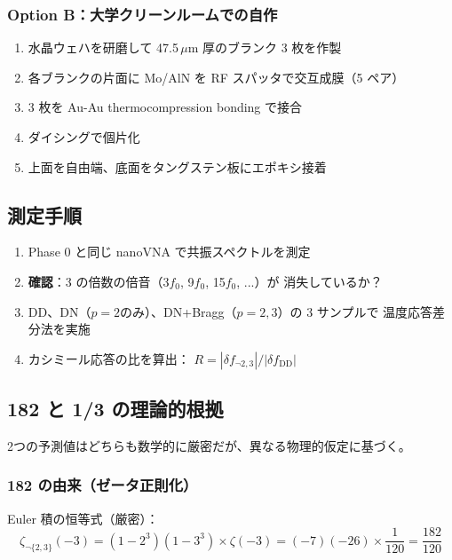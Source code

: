 \documentclass[11pt,a4paper]{article}
\begin{document}
\subsubsection{Option B：大学クリーンルームでの自作}

\begin{enumerate}
\item 水晶ウェハを研磨して 47.5\,$\mu$m 厚のブランク 3 枚を作製
\item 各ブランクの片面に Mo/AlN を RF スパッタで交互成膜（5 ペア）
\item 3 枚を Au-Au thermocompression bonding で接合
\item ダイシングで個片化
\item 上面を自由端、底面をタングステン板にエポキシ接着
\end{enumerate}

\subsection{測定手順}

\begin{enumerate}
\item Phase 0 と同じ nanoVNA で共振スペクトルを測定
\item \textbf{確認}：3 の倍数の倍音（3$f_0$, 9$f_0$, 15$f_0$, ...）が
  消失しているか？
\item DD、DN（$p=2$のみ）、DN+Bragg（$p=2,3$）の 3 サンプルで
  温度応答差分法を実施
\item カシミール応答の比を算出：
  $R = |\delta f_{\neg 2,3}| / |\delta f_{\mathrm{DD}}|$
\end{enumerate}

\subsection{182 と 1/3 の理論的根拠}

2つの予測値はどちらも数学的に厳密だが、異なる物理的仮定に基づく。

\subsubsection{182 の由来（ゼータ正則化）}

Euler 積の恒等式（厳密）：
\begin{equation}
  \zeta_{\neg\{2,3\}}(-3) = (1 - 2^3)(1 - 3^3) \times \zeta(-3)
  = (-7)(-26) \times \frac{1}{120} = \frac{182}{120}
\end{equation}
\end{document}
